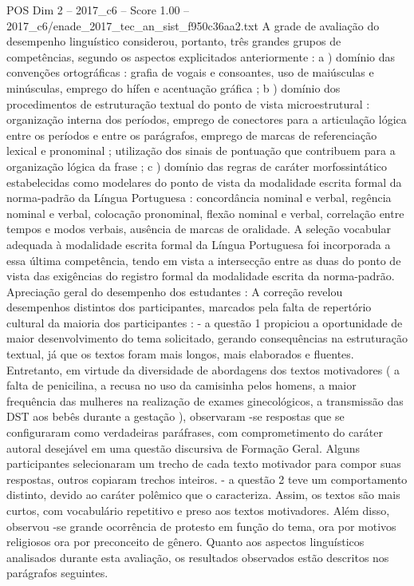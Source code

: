 \begin{textsample}{POS Dim 2 – 2017\_c6 – Score 1.00 – 2017\_c6/enade\_2017\_tec\_an\_sist\_f950c36aa2.txt}
A grade de avaliação do desempenho linguístico considerou, portanto, três grandes grupos de competências, segundo os aspectos explicitados anteriormente : a ) domínio das convenções ortográficas : grafia de vogais e consoantes, uso de maiúsculas e minúsculas, emprego do hífen e acentuação gráfica ; b ) domínio dos procedimentos de estruturação textual do ponto de vista microestrutural : organização interna dos períodos, emprego de conectores para a articulação lógica entre os períodos e entre os parágrafos, emprego de marcas de referenciação lexical e pronominal ; utilização dos sinais de pontuação que contribuem para a organização lógica da frase ; c ) domínio das regras de caráter morfossintático estabelecidas como modelares do ponto de vista da modalidade escrita formal da norma-padrão da Língua Portuguesa : concordância nominal e verbal, regência nominal e verbal, colocação pronominal, flexão nominal e verbal, correlação entre tempos e modos verbais, ausência de marcas de oralidade.
A seleção vocabular adequada à modalidade escrita formal da Língua Portuguesa foi incorporada a essa última competência, tendo em vista a intersecção entre as duas do ponto de vista das exigências do registro formal da modalidade escrita da norma-padrão.
Apreciação geral do desempenho dos estudantes : A correção revelou desempenhos distintos dos participantes, marcados pela falta de repertório cultural da maioria dos participantes : - a questão 1 propiciou a oportunidade de maior desenvolvimento do tema solicitado, gerando consequências na estruturação textual, já que os textos foram mais longos, mais elaborados e fluentes.
Entretanto, em virtude da diversidade de abordagens dos textos motivadores ( a falta de penicilina, a recusa no uso da camisinha pelos homens, a maior frequência das mulheres na realização de exames ginecológicos, a transmissão das DST aos bebês durante a gestação ), observaram -se respostas que se configuraram como verdadeiras paráfrases, com comprometimento do caráter autoral desejável em uma questão discursiva de Formação Geral.
Alguns participantes selecionaram um trecho de cada texto motivador para compor suas respostas, outros copiaram trechos inteiros. - a questão 2 teve um comportamento distinto, devido ao caráter polêmico que o caracteriza.
Assim, os textos são mais curtos, com vocabulário repetitivo e preso aos textos motivadores.
Além disso, observou -se grande ocorrência de protesto em função do tema, ora por motivos religiosos ora por preconceito de gênero.
Quanto aos aspectos linguísticos analisados durante esta avaliação, os resultados observados estão descritos nos parágrafos seguintes.

\end{textsample}
